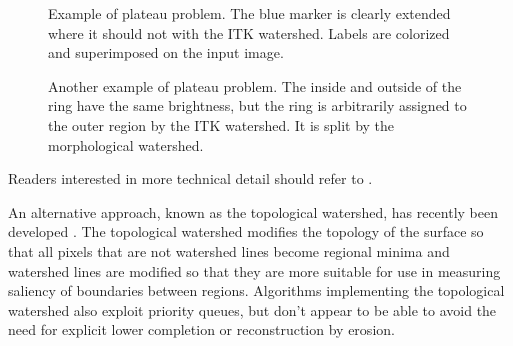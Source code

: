 \documentclass{InsightArticle}
\begin{document}
\begin{figure}[htbp]
\begin{center}
\caption{Example of plateau problem. The blue marker is clearly extended where it should not with the ITK watershed. Labels are colorized and superimposed on the input image.\label{fig:cthead1-markers}}
\end{center}
\end{figure}


\begin{figure}[htbp]
\begin{center}
\caption{Another example of plateau problem. The inside and outside of the ring have the same brightness, but the ring is arbitrarily assigned to the outer region by the ITK watershed. It is split by the morphological watershed.\label{fig:circle}}
\end{center}
\end{figure}


Readers interested in more technical detail should refer to
\cite{Roerdink2000a,Meijster2004a}.

An alternative approach, known as the topological watershed, has
recently been developed \cite{topologicalWatershed}. The topological watershed modifies
the topology of the surface so that all pixels that are not watershed
lines become regional minima and watershed lines are modified so that
they are more suitable for use in measuring saliency of boundaries
between regions. Algorithms implementing the topological watershed
also exploit priority queues, but don't appear to be able to avoid the
need for explicit lower completion or reconstruction by erosion.
\end{document}
